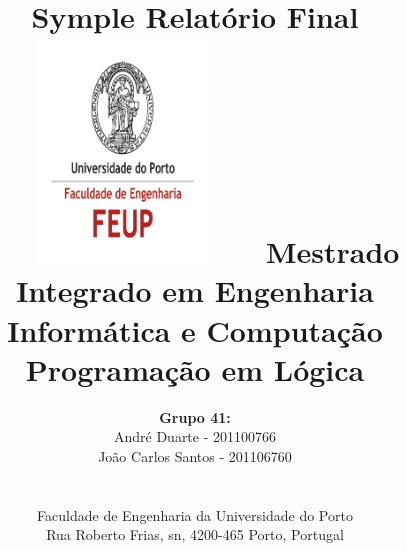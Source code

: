 \documentclass[a4paper]{article}
\begin{document}
\setlength{\textwidth}{16cm}
\setlength{\textheight}{22cm}

\title{\Huge\textbf{Symple}\linebreak\linebreak\linebreak
\Large\textbf{Relatório Final}\linebreak\linebreak
\includegraphics[height=6cm, width=7cm]{feup.pdf}\linebreak \linebreak
\Large{Mestrado Integrado em Engenharia Informática e Computação} \linebreak \linebreak
\Large{Programação em Lógica}\linebreak
}

\author{\textbf{Grupo 41:}\\ André Duarte - 201100766 \\ João Carlos Santos - 201106760 \\\linebreak\linebreak \\
 \\ Faculdade de Engenharia da Universidade do Porto \\ Rua Roberto Frias, s\/n, 4200-465 Porto, Portugal \linebreak\linebreak\linebreak
\linebreak\linebreak\vspace{1cm}}
\maketitle
\thispagestyle{empty}

\end{document}
